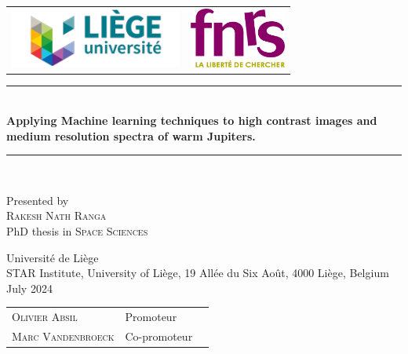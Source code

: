 \documentclass[12pt,chapterprefix=True]{book}
\newcommand{\HRule}{\rule{\linewidth}{0.7mm}}
\newcommand{\Hrule}{\rule{\linewidth}{0.3mm}}
\begin{document}
	
	\begin{titlepage}
		\color{white}
		\begin{center}
			\begin{tabular}{c@{\hskip 3cm}c}
				\includegraphics[height=2cm]{images/uliege logo.png} &
				\includegraphics[height=2cm]{images/FRS-FNRS_ros_vert_transp.png}\\
			\end{tabular}
		\end{center}
  \vspace{1cm}
  \begin{center}
	 		\HRule \\[0.2cm]
	 		 { \Large \bfseries Applying Machine learning techniques to high contrast images and medium resolution spectra of warm Jupiters.}
	  		\Hrule \\
		\end{center}
\vspace{1cm}
		\begin{center}
			Presented by \\[0.5cm] 
   \textsc{\Large Rakesh Nath Ranga}\\[0.1cm]
			PhD thesis in \textsc{\large Space Sciences}\\%
		\end{center}
     \vspace{1cm}
		\begin{center}
			Université de Li\`ege\\
			STAR Institute, University of Liège, 19 Allée du Six Août, 4000 Liège, Belgium\\
			\vspace{0.5cm}
			July 2024
		\end{center}
		\vspace{1cm}
		\begin{center}
			\begin{tabular}{lll}
				\textsc{Olivier Absil}  &  Promoteur\\
				\textsc{Marc Vandenbroeck}  &  Co-promoteur \\
			\end{tabular}\\%
		\end{center}
	\end{titlepage}
	\newpage
	\ClearWallPaper
\end{document}
